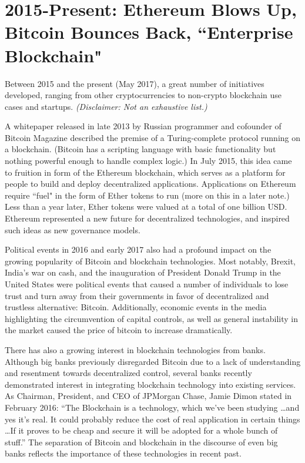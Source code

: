 \documentclass[full.tex]{subfiles}
\begin{document}
    \section*{2015-Present: Ethereum Blows Up, Bitcoin Bounces Back, ``Enterprise Blockchain"}
    
    Between 2015 and the present (May 2017), a great number of initiatives developed, ranging from other cryptocurrencies to non-crypto blockchain use cases and startups. \textit{(Disclaimer: Not an exhaustive list.)}
    
    A whitepaper released in late 2013 by Russian programmer and cofounder of Bitcoin Magazine described the premise of a Turing-complete protocol running on a blockchain. (Bitcoin has a scripting language with basic functionality but nothing powerful enough to handle complex logic.) In July 2015, this idea came to fruition in form of the Ethereum blockchain, which serves as a platform for people to build and deploy decentralized applications. Applications on Ethereum require ``fuel" in the form of Ether tokens to run (more on this in a later note.) Less than a year later, Ether tokens were valued at a total of one billion USD. Ethereum represented a new future for decentralized technologies, and inspired such ideas as new governance models.
    
    Political events in 2016 and early 2017 also had a profound impact on the growing popularity of Bitcoin and blockchain technologies. Most notably, Brexit, India's war on cash, and the inauguration of President Donald Trump in the United States were political events that caused a number of individuals to lose trust and turn away from their governments in favor of decentralized and trustless alternative: Bitcoin. Additionally, economic events in the media highlighting the circumvention of capital controls, as well as general instability in the market caused the price of bitcoin to increase dramatically.
    
    There has also a growing interest in blockchain technologies from banks. Although big banks previously disregarded Bitcoin due to a lack of understanding and resentment towards decentralized control, several banks recently demonstrated interest in integrating blockchain technology into existing services. As Chairman, President, and CEO of JPMorgan Chase, Jamie Dimon stated in February 2016: ``The Blockchain is a technology, which we've been studying \ldots and yes it's real. It could probably reduce the cost of real application in certain things \ldots If it proves to be cheap and secure it will be adopted for a whole bunch of stuff.'' The separation of Bitcoin and blockchain in the discourse of even big banks reflects the importance of these technologies in recent past.
    
\end{document}
